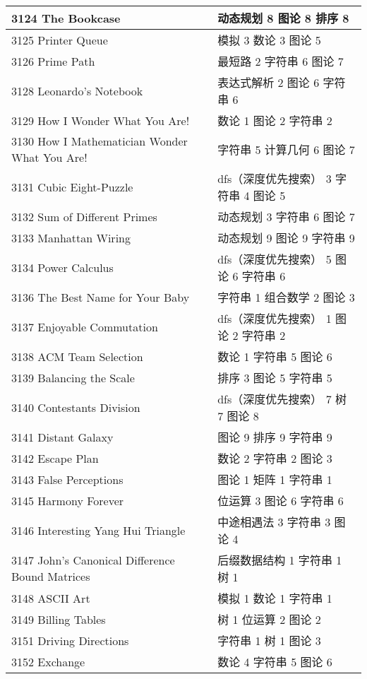 \begin{longtable}{| p{} | p{} |}
 3124 The Bookcase  & 动态规划 8 图论 8 排序 8 \\ \hline
 3125 Printer Queue  & 模拟 3 数论 3 图论 5 \\ \hline
 3126 Prime Path  & 最短路 2 字符串 6 图论 7 \\ \hline
 3128 Leonardo's Notebook  & 表达式解析 2 图论 6 字符串 6 \\ \hline
 3129 How I Wonder What You Are!  & 数论 1 图论 2 字符串 2 \\ \hline
 3130 How I Mathematician Wonder What You Are!  & 字符串 5 计算几何 6 图论 7 \\ \hline
 3131 Cubic Eight-Puzzle  & dfs（深度优先搜索） 3 字符串 4 图论 5 \\ \hline
 3132 Sum of Different Primes  & 动态规划 3 字符串 6 图论 7 \\ \hline
 3133 Manhattan Wiring  & 动态规划 9 图论 9 字符串 9 \\ \hline
 3134 Power Calculus  & dfs（深度优先搜索） 5 图论 6 字符串 6 \\ \hline
 3136 The Best Name for Your Baby  & 字符串 1 组合数学 2 图论 3 \\ \hline
 3137 Enjoyable Commutation  & dfs（深度优先搜索） 1 图论 2 字符串 2 \\ \hline
 3138 ACM Team Selection  & 数论 1 字符串 5 图论 6 \\ \hline
 3139 Balancing the Scale  & 排序 3 图论 5 字符串 5 \\ \hline
 3140 Contestants Division  & dfs（深度优先搜索） 7 树 7 图论 8 \\ \hline
 3141 Distant Galaxy  & 图论 9 排序 9 字符串 9 \\ \hline
 3142 Escape Plan  & 数论 2 字符串 2 图论 3 \\ \hline
 3143 False Perceptions  & 图论 1 矩阵 1 字符串 1 \\ \hline
 3145 Harmony Forever  & 位运算 3 图论 6 字符串 6 \\ \hline
 3146 Interesting Yang Hui Triangle  & 中途相遇法 3 字符串 3 图论 4 \\ \hline
 3147 John's Canonical Difference Bound Matrices  & 后缀数据结构 1 字符串 1 树 1 \\ \hline
 3148 ASCII Art  & 模拟 1 数论 1 字符串 1 \\ \hline
 3149 Billing Tables  & 树 1 位运算 2 图论 2 \\ \hline
 3151 Driving Directions  & 字符串 1 树 1 图论 3 \\ \hline
 3152 Exchange  & 数论 4 字符串 5 图论 6 \\ \hline

\end{longtable}
